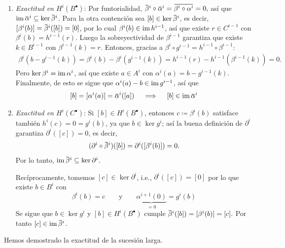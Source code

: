 \begin{sol}
\begin{enumerate}
    \item \emph{Exactitud en $H^i(B^{\bullet})$}: Por funtorialidad,
    \(
    \ubar\beta^i\circ\ubar\alpha^i
    =\ubar{\beta^i\circ\alpha^i}
    =0,
    \)
    así que $\im\ubar\alpha^i\subseteq\ker\ubar\beta^i$. Para la otra contención sea $[b]\in\ker\ubar\beta^i$, es decir, $[\beta^i(b)]=\ubar\beta^i([b])=[0]$, por lo cual $\beta^i(b)\in\operatorname{im} h^{i-1}$, así que existe $r\in C^{i-1}$ con $\beta^i(b)=h^{i-1}(r)$. Luego la sobreyectividad de $\beta^{i-1}$ garantiza que existe $k\in B^{i-1}$ con $\beta^{i-1}(k)=r$. Entonces, gracias a $\beta^i\circ g^{i-1}=h^{i-1}\circ\beta^{i-1}$:
    \begin{align*}
    \beta^i(b-g^{i-1}(k))
    =\beta^i(b)-\beta^i(g^{i-1}(k))
    =h^{i-1}(r)-h^{i-1}(\beta^{i-1}(k))=0.
    \end{align*}
    Pero $\ker\beta^i=\operatorname{im}\alpha^i$, así que existe $a\in A^i$ con $\alpha^i(a)=b-g^{i-1}(k)$. Finalmente, de esto se sigue que $\alpha^i(a)-b\in\operatorname{im} g^{i-1}$, así que
    \[
    [b]=[\alpha^i(a)]=\ubar\alpha^i([a])
    \quad\implies\quad 
    [b]\in\im\ubar\alpha^i
    \]

    \item \emph{Exactitud en $H^i(C^{\bullet})$}: Si $[b]\in H^i(B^{\bullet})$, entonces $c\coloneq\beta^i(b)$ satisface también $h^i(c)=0=g^i(b)$, ya que $b\in\ker g^i$; así la buena definición de $\partial^i$ garantiza $\partial^i([c])=0$, es decir,
    \[
    (\partial^i\circ\ubar\beta^i)([b])
    =\partial^i([\beta^i(b)])=0.
    \]
    Por lo tanto, $\im\ubar\beta^i\subseteq\ker\partial^i$.

    Recíprocamente, tomemos $[c]\in\ker\partial^i$, i.e., $\partial^i([c])=[0]$ por lo que existe $b\in B^i$ con
    \[
    \beta^i(b)=c
    \qquad\text{y}\qquad
    \underbrace{\alpha^{i+1}(0)}_{=0}=g^i(b)
    \]
    Se sigue que $b\in\ker g^i$ y $[b]\in H^i(B^{\bullet})$ cumple
    \(
    \ubar\beta^i([b])=[\beta^i(b)]=[c].
    \)
    Por tanto $[c]\in\im\ubar\beta^i$.
\end{enumerate}
Hemos demostrado la exactitud de la sucesión larga.
\end{sol}
